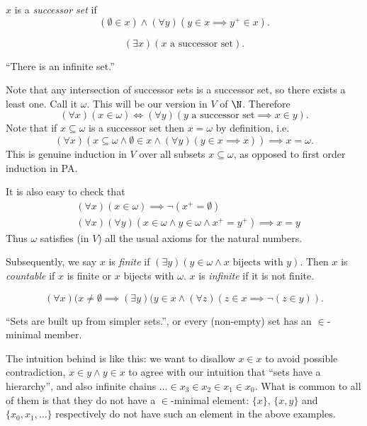 \documentclass[a4paper]{article}
\begin{document}
\begin{definition}
  \(x\) is a \emph{successor set} if
  \[
    (\emptyset \in x) \land (\forall y) (y \in x \implies y^+ \in x).
  \]
\end{definition}

\begin{axiom*}
  \[
    (\exists x) (x \text{ a successor set}).
  \]
\end{axiom*}
``There is an infinite set.''

Note that any intersection of successor sets is a successor set, so there exists a least one. Call it \(\omega\). This will be our version in \(V\) of \(\N\). Therefore
\[
  (\forall x) (x \in \omega) \iff (\forall y) (y \text{ a successor set} \implies x \in y).
\]
Note that if \(x \subseteq \omega\) is a successor set then \(x = \omega\) by definition, i.e.
\[
  (\forall x) (x \subseteq \omega \land \emptyset \in x \land (\forall y) (y \in x \implies x)) \implies x = \omega.
\]
This is genuine induction in \(V\) over all subsets \(x \subseteq \omega\), as opposed to first order induction in PA.

It is also easy to check that
\begin{align*}
  & (\forall x) (x \in \omega) \implies \neg (x^+ = \emptyset) \\
  & (\forall x) (\forall y) (x \in \omega \land y \in \omega \land x^+ = y^+) \implies x = y
\end{align*}
Thus \(\omega\) satisfies (in \(V\)) all the usual axioms for the natural numbers.

Subsequently, we say \(x\) is \emph{finite} if \((\exists y) (y \in \omega \land x \text{ bijects with } y)\). Then \(x\) is \emph{countable} if \(x\) is finite or \(x\) bijects with \(\omega\). \(x\) is \emph{infinite} if it is not finite.

\begin{axiom*}
  \[
    (\forall x) (x \neq \emptyset \implies (\exists y) (y \in x \land (\forall z) (z \in x \implies \neg (z \in y)).
  \]
\end{axiom*}
``Sets are built up from simpler sets.'', or every (non-empty) set has an \(\in\)-minimal member.

The intuition behind is like this: we want to disallow \(x \in x\) to avoid possible contradiction, \(x \in y \land y \in x\) to agree with our intuition that ``sets have a hierarchy'', and also infinite chains \(\dots \in x_3 \in x_2 \in x_1 \in x_0\). What is common to all of them is that they do not have a \(\in\)-minimal element: \(\{x\}\), \(\{x, y\}\) and \(\{x_0, x_1, \dots\}\) respectively do not have such an element in the above examples.
\end{document}
